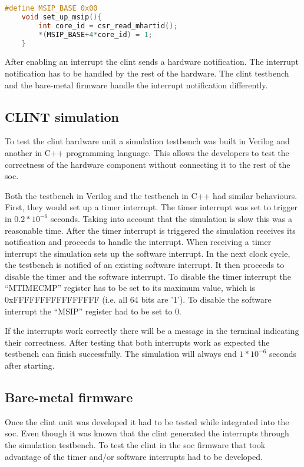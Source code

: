 \begin{lstlisting}[language=C, caption={Set Up Software Interrupt.}, label=lst:set_up_msip]
    #define MSIP_BASE 0x00
    void set_up_msip(){
        int core_id = csr_read_mhartid();
        *(MSIP_BASE+4*core_id) = 1;
    }
\end{lstlisting}

After enabling an interrupt the \acrshort{clint} sends a hardware notification. The interrupt notification has to be handled by the rest of the hardware. The \acrshort{clint} testbench and the bare-metal firmware handle the interrupt notification differently.

\subsection{CLINT simulation}
To test the \acrshort{clint} hardware unit a simulation testbench was built in Verilog and another in C++ programming language. This allows the developers to test the correctness of the hardware component without connecting it to the rest of the \acrshort{soc}.

Both the testbench in Verilog and the testbench in C++ had similar behaviours. First, they would set up a timer interrupt. The timer interrupt was set to trigger in $0.2*10^{-6}$ seconds. Taking into account that the simulation is slow this was a reasonable time. After the timer interrupt is triggered the simulation receives its notification and proceeds to handle the interrupt. When receiving a timer interrupt the simulation sets up the software interrupt. In the next clock cycle, the testbench is notified of an existing software interrupt. It then proceeds to disable the timer and the software interrupt. To disable the timer interrupt the \enquote{MTIMECMP} register has to be set to its maximum value, which is 0xFFFFFFFFFFFFFFFF (i.e. all 64 bits are '1'). To disable the software interrupt the \enquote{MSIP} register had to be set to 0.

If the interrupts work correctly there will be a message in the terminal indicating their correctness. After testing that both interrupts work as expected the testbench can finish successfully. The simulation will always end $1*10^{-6}$ seconds after starting.

\subsection{Bare-metal firmware}
Once the \acrshort{clint} unit was developed it had to be tested while integrated into the \acrshort{soc}. Even though it was known that the \acrshort{clint} generated the interrupts through the simulation testbench. To test the \acrshort{clint} in the \acrshort{soc} firmware that took advantage of the timer and/or software interrupts had to be developed.

